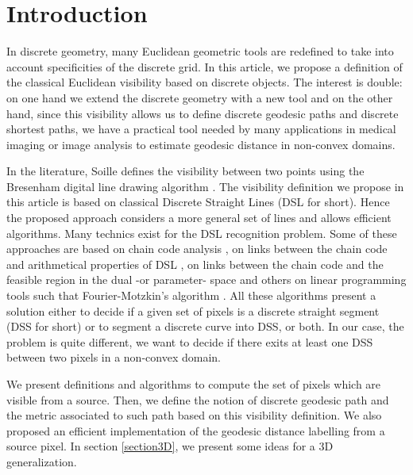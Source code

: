 \documentclass[fleqn,twoside]{article}
\begin{document}





\section{Introduction}

In discrete geometry, many Euclidean  geometric tools are redefined to
take   into  account  specificities  of  the  discrete  grid.  In this
article, we propose a definition of the classical Euclidean visibility
based on  discrete  objects.  The interest  is double:  on one hand we
extend  the discrete geometry  with a new tool and  on the other hand,
since this visibility allows us to  define discrete geodesic paths and
discrete  shortest  paths, we have a   practical  tool needed  by many
applications in medical imaging or image analysis to estimate geodesic
distance in non-convex domains.

In the  literature, Soille \cite{soille91,soille94,soillebook}    defines the
visibility between two   points  using the Bresenham   digital line
drawing algorithm \cite{bres65}. The  visibility definition we
propose  in this article is based on
classical   Discrete Straight Lines  (DSL  for short).  Hence the
proposed approach considers a more general set of lines and allows
efficient algorithms.
Many technics
exist for the  DSL recognition problem. Some  of these  approaches are
based on chain code  analysis \cite{wu}, on  links between the  chain
code and arithmetical properties of DSL \cite{DEB95b,DEB95}, on links
between the chain   code and  the  feasible  region in  the dual   -or
parameter- space \cite{dor91,bruck93,vittone}  and  others  on linear
programming      tools    such     that  Fourier-Motzkin's   algorithm
\cite{fourier}.  All these algorithms  present  a solution either  to
decide if a given  set of pixels is a  discrete straight  segment (DSS
for short) or  to segment a discrete curve  into DSS, or  both. In our
case, the problem is quite different, we want to decide if there exits
at least one DSS between two pixels in a non-convex domain.

We present  definitions and  algorithms to  compute  the set of pixels
which are visible from a source.  Then, we define the  notion of discrete
geodesic path  and  the  metric associated to  such   path based on  this
visibility definition. We also proposed an efficient implementation of
the geodesic distance labelling from a source pixel. In section
\ref{section3D}, we present some ideas for a 3D generalization.
\end{document}
